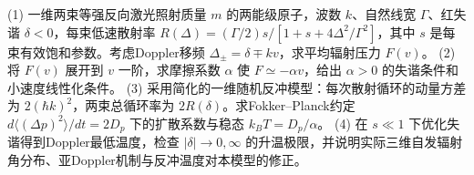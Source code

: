 (1) 一维两束等强反向激光照射质量 \(m\) 的两能级原子，波数 \(k\)、自然线宽 \(\Gamma\)、红失谐 \(\delta<0\)，每束低速散射率 \(R(\Delta)=(\Gamma/2)s/[1+s+4\Delta^2/\Gamma^2]\)，其中 \(s\) 是每束有效饱和参数。考虑Doppler移频 \(\Delta_\pm=\delta\mp kv\)，求平均辐射压力 \(F(v)\)。
(2) 将 \(F(v)\) 展开到 \(v\) 一阶，求摩擦系数 \(\alpha\) 使 \(F\simeq-\alpha v\)，给出 \(\alpha>0\) 的失谐条件和小速度线性化条件。
(3) 采用简化的一维随机反冲模型：每次散射循环的动量方差为 \(2(\hbar k)^2\)，两束总循环率为 \(2R(\delta)\)。求Fokker–Planck约定 \(d\langle(\Delta p)^2\rangle/dt=2D_p\) 下的扩散系数与稳态 \(k_BT=D_p/\alpha\)。
(4) 在 \(s\ll1\) 下优化失谐得到Doppler最低温度，检查 \(|\delta|\to0,\infty\) 的升温极限，并说明实际三维自发辐射角分布、亚Doppler机制与反冲温度对本模型的修正。
